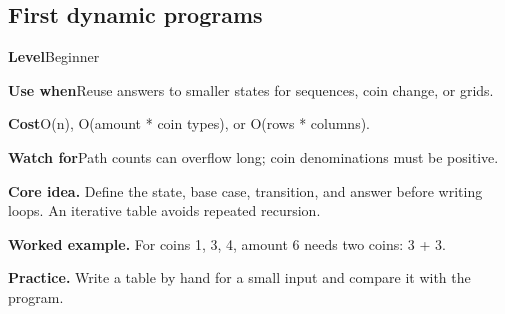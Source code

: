 \documentclass[10pt,letterpaper]{article}
\newcommand{\entrylabel}[1]{\textcolor{accent}{\bfseries #1}}
\begin{document}
\subsection{First dynamic programs}
\begin{guidebox}\small
\entrylabel{Level}\quad Beginner\par
\entrylabel{Use when}\quad Reuse answers to smaller states for sequences, coin change, or grids.\par
\entrylabel{Cost}\quad O(n), O(amount * coin types), or O(rows * columns).\par
\entrylabel{Watch for}\quad Path counts can overflow long; coin denominations must be positive.\par
\end{guidebox}
\noindent\textbf{Core idea.} Define the state, base case, transition, and answer before writing loops. An iterative table avoids repeated recursion.\par
\noindent\textbf{Worked example.} For coins 1, 3, 4, amount 6 needs two coins: 3 + 3.\par
\noindent\textbf{Practice.} Write a table by hand for a small input and compare it with the program.\par
\end{document}
